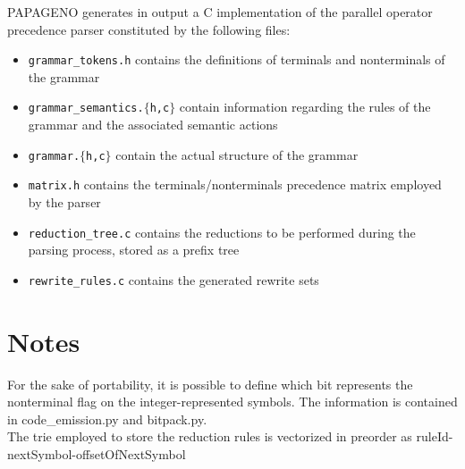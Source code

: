 \documentclass[a4paper,10pt]{article}
\begin{document}
PAPAGENO generates in output a C implementation of the parallel operator precedence parser constituted by the following files:
\begin{itemize}
 \item \texttt{grammar\_tokens.h} contains the definitions of terminals and nonterminals of the grammar
 \item \texttt{grammar\_semantics.$\{$h,c$\}$} contain information regarding the rules of the grammar and the associated semantic actions
 \item \texttt{grammar.$\{$h,c$\}$} contain the actual structure of the grammar
 \item \texttt{matrix.h} contains the terminals/nonterminals precedence matrix employed by the parser
 \item \texttt{reduction\_tree.c} contains the reductions to be performed during the parsing process, stored as a prefix tree
 \item \texttt{rewrite\_rules.c} contains the generated rewrite sets
\end{itemize}

\section{Notes}
For the sake of portability, it is possible to define which bit represents the nonterminal flag on the integer-represented symbols.
The information is contained in code_emission.py and bitpack.py.\\

The trie employed to store the reduction rules is vectorized in preorder as ruleId-nextSymbol-offsetOfNextSymbol
\end{document}
